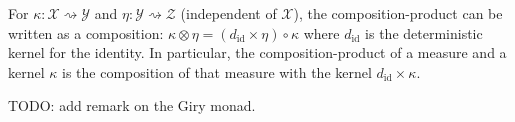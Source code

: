 For $\kappa : \mathcal X \rightsquigarrow \mathcal Y$ and $\eta : \mathcal Y \rightsquigarrow \mathcal Z$ (independent of $\mathcal X$), the composition-product can be written as a composition: $\kappa \otimes \eta = (d_{\text{id}} \times \eta) \circ \kappa$ where $d_{\text{id}}$ is the deterministic kernel for the identity.
In particular, the composition-product of a measure and a kernel $\kappa$ is the composition of that measure with the kernel $d_{\text{id}} \times \kappa$.

TODO: add remark on the Giry monad.